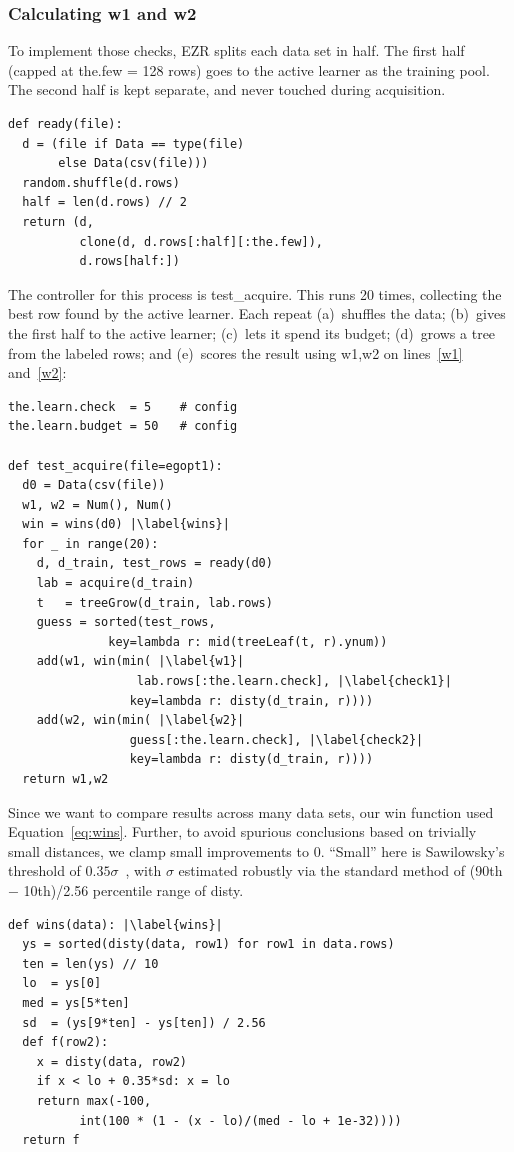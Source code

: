 \documentclass[AMA,STIX2COL]{WileyNJDv5}
\begin{document}
\subsubsection{Calculating \textsf{w1} and \textsf{w2}}
To implement those checks, EZR splits each data set in half.
The first half (capped at \textsf{the.few} = 128 rows) goes to
the active learner as the training pool. The second half is
kept separate, and never touched during acquisition.
\begin{verbatim}
def ready(file):
  d = (file if Data == type(file)
       else Data(csv(file)))
  random.shuffle(d.rows)
  half = len(d.rows) // 2
  return (d, 
          clone(d, d.rows[:half][:the.few]),
          d.rows[half:])
\end{verbatim}
The controller for this process is \textsf{test\_acquire}. This runs 
20 times, collecting the best row found by the active learner. Each 
repeat (a)~shuffles the data; (b)~gives the first half to the active 
learner; (c)~lets it spend its budget; (d)~grows a tree from the 
labeled rows; and (e)~scores the result using \textsf{w1,w2}  on lines~\ref{w1} 
and~\ref{w2}:
\begin{verbatim}
the.learn.check  = 5    # config
the.learn.budget = 50   # config

def test_acquire(file=egopt1):
  d0 = Data(csv(file))
  w1, w2 = Num(), Num()
  win = wins(d0) |\label{wins}|
  for _ in range(20):
    d, d_train, test_rows = ready(d0)
    lab = acquire(d_train)
    t   = treeGrow(d_train, lab.rows)
    guess = sorted(test_rows,
              key=lambda r: mid(treeLeaf(t, r).ynum))
    add(w1, win(min( |\label{w1}|
                  lab.rows[:the.learn.check], |\label{check1}|
                 key=lambda r: disty(d_train, r))))
    add(w2, win(min( |\label{w2}|
                 guess[:the.learn.check], |\label{check2}|
                 key=lambda r: disty(d_train, r))))
  return w1,w2
\end{verbatim}

Since we want to compare results across
many data sets,
our \textsf{win} function used
Equation~\ref{eq:wins}. Further,
to avoid spurious conclusions based on trivially
small distances, we
clamp small improvements to 0. ``Small'' here is Sawilowsky's
threshold of $0.35\sigma$~\cite{sawilowsky2009new}, with $\sigma$
estimated robustly via  the standard method of   (90th $-$ 10th)/2.56 percentile range
of \textsf{disty}.
\begin{verbatim}
def wins(data): |\label{wins}| 
  ys = sorted(disty(data, row1) for row1 in data.rows)
  ten = len(ys) // 10
  lo  = ys[0]
  med = ys[5*ten]
  sd  = (ys[9*ten] - ys[ten]) / 2.56
  def f(row2):
    x = disty(data, row2)
    if x < lo + 0.35*sd: x = lo
    return max(-100,
          int(100 * (1 - (x - lo)/(med - lo + 1e-32))))
  return f
\end{verbatim}
\end{document}
